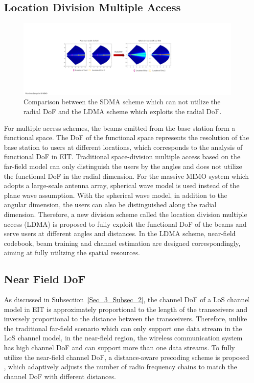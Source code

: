 \documentclass[journal,twocolumn]{IEEEtran}
\begin{document}
\subsection{Location Division Multiple Access}
\begin{figure}
	\centering 
	\includegraphics[width=\textwidth]{figures/LDMA.pdf} 
	\caption{Comparison between the SDMA scheme which can not utilize the radial DoF and the LDMA scheme which exploits the radial DoF. \cite{wu2022multiple} }
	\label{fig:LDMA}
\end{figure}
For multiple access schemes, the beams emitted from the base station form a functional space. The DoF of the functional space represents the resolution of the base station to users at different locations, which corresponds to the analysis of functional DoF in EIT. 
Traditional space-division multiple access based on the far-field model can only distinguish the users by the angles and does not utilize the functional DoF in the radial dimension. 
For the massive MIMO system which adopts a large-scale antenna array, spherical wave model is used instead of the plane wave assumption. 
With the spherical wave model, in addition to the angular dimension, the users can also be distinguished along the radial dimension. 
Therefore, a new division scheme called the location division multiple access (LDMA) is proposed to fully exploit the functional DoF of the beams and serve users at different angles and distances. 
In the LDMA scheme, near-field codebook, beam training and channel estimation are designed correspondingly, aiming at fully utilizing the spatial resources. 

\subsection{Near Field DoF}
As discussed in Subsection~\ref{Sec_3_Subsec_2}, the channel DoF of a LoS channel model in EIT is approximately proportional to the length of the transceivers and inversely proportional to the distance between the transceivers. Therefore, unlike the traditional far-field scenario which can only support one data stream in the LoS channel model, in the near-field region, the wireless communication system has high channel DoF and can support more than one data streams. To fully utilize the near-field channel DoF, a distance-aware precoding scheme is proposed \cite{wu2022multiple}, which adaptively adjusts the number of radio frequency chains to match the channel DoF with different distances.   
\end{document}

